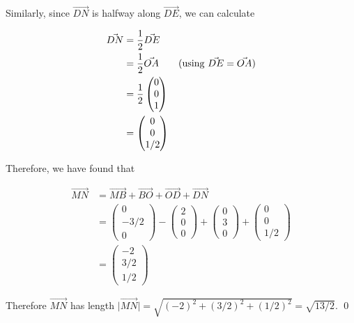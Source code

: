 \begin{solution}
    Similarly, since $\vec{DN}$ is halfway along $\vec{DE}$, we can calculate 

    \begin{align*}
        \vec{DN} &= \frac{1}{2} \vec{DE} \\
        &= \frac{1}{2} \vec{OA} \tag{using $\vec{DE} = \vec{OA}$}\\
        &=  \frac{1}{2} \begin{pmatrix}0\\0\\1\end{pmatrix} \\
        &= \begin{pmatrix}0\\0\\1/2\end{pmatrix}
    \end{align*}

    Therefore, we have found that 

    \begin{align*}
         \vec{MN} &= \vec{MB} + \vec{BO} + \vec{OD} + \vec{DN} \\
         &= \begin{pmatrix}0\\-3/2\\0\end{pmatrix} -\begin{pmatrix}2\\0\\0\end{pmatrix} + \begin{pmatrix}0\\3\\0\end{pmatrix} + \begin{pmatrix}0\\0\\1/2\end{pmatrix} \\
         &= \begin{pmatrix}-2\\3/2\\1/2\end{pmatrix}
    \end{align*}

    Therefore $\vec{MN}$ has length $\vert \vec{MN}\vert = \sqrt{(-2)^2 + (3/2)^2 + (1/2)^2} = \sqrt{13/2}$.
    \qed
\end{solution}
